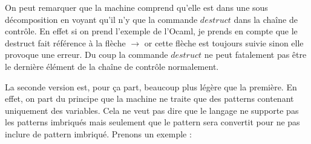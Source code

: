 \documentclass[10pt,a4paper]{report}
\begin{document}
	On peut remarquer que la machine comprend qu'elle est dans une sous décomposition en voyant qu'il n'y que la commande $destruct$ dans la chaîne de contrôle. En effet si on prend l'exemple de l'Ocaml, je prends en compte que le destruct fait référence à la flèche $\rightarrow$ or cette flèche est toujours suivie sinon elle provoque une erreur. Du coup la commande $destruct$ ne peut fatalement pas être le dernière élément de la chaîne de contrôle normalement.
	\bigbreak
	
	La seconde version est, pour ça part, beaucoup plus légère que la première. En effet, on part du principe que la machine ne traite que des patterns contenant uniquement des variables. Cela ne veut pas dire que le langage ne supporte pas les patterns imbriqués mais seulement que le pattern sera convertit pour ne pas inclure de pattern imbriqué. Prenons un exemple :
	
\end{document}
